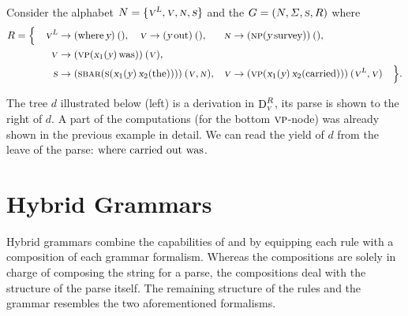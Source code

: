 \documentclass[../document.tex]{subfiles}
\begin{document}
    \begin{example}
        Consider the alphabet \(N = \{\textsc{\textsl{v}}^{\textsc{\textsl{L}}}, \textsc{\textsl{v}}, \textsc{\textsl{n}}, \textsc{\textsl{s}} \}\) and the  \(G = (N, \varSigma, \textsc{\textsl{s}}, R)\) where
        \begin{align*}
            R = \Big\{ \quad
            \textsc{\textsl{v}}^{\textsc{\textsl{L}}} &\to (\text{where} \, \textsl{y})\:(),
            \quad \textsc{\textsl{v}} \to (\textsl{y} \, \text{out})\:(),
            &\textsc{\textsl{n}} &\to (\textsc{np} (\textsl{y} \, \text{survey}))\:(), \\
            \textsc{\textsl{v}} &\to (\textsc{vp}(\textsl{x}_1(\textsl{y}) \, \text{was}))\:(\textsc{\textsl{v}}),  \\
            \textsc{\textsl{s}} &\to (\textsc{sbar} (\textsc{s} (\textsl{x}_1(\textsl{y}) \, \textsl{x}_2(\text{the}))))\:(\textsc{\textsl{v}}, \textsc{\textsl{n}}),
            &\textsc{\textsl{v}} &\to (\textsc{vp}(\textsl{x}_1(\textsl{y}) \, \textsl{x}_2(\text{carried})))\:(\textsc{\textsl{v}}^{\textsc{\textsl{L}}}, \textsc{\textsl{v}})
            \quad \Big\} \text{.}
        \end{align*}

        The tree \(d\) illustrated below (left) is a derivation in \(\operatorname{D}^R_{\textsc{\textsl{v}}}\), its parse is shown to the right of \(d\).
        A part of the computations (for the bottom \(\textsc{vp}\)-node) was already shown in the previous example in detail.
        We can read the yield of \(d\) from the leave of the parse: \(\text{where carried out was}\).

        \null\hfill
        \hfill
        \hfill\null
    \end{example}


    \section{Hybrid Grammars}
    Hybrid grammars combine the capabilities of  and  by equipping each rule with a composition of each grammar formalism.
    Whereas the  compositions are solely in charge of composing the string for a parse, the  compositions deal with the structure of the parse itself.
    The remaining structure of the rules and the grammar resembles the two aforementioned formalisms.
\end{document}
